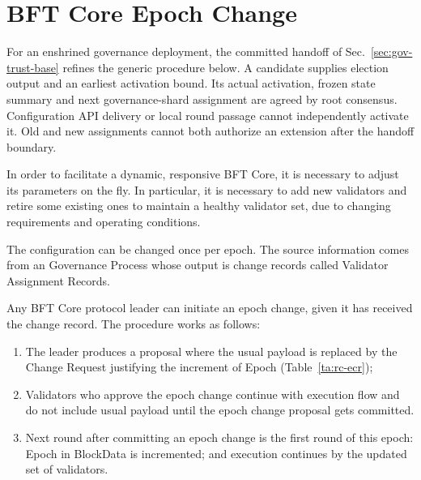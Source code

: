 \section{BFT Core Epoch Change}\label{sec:bft-epoch-change}

For an enshrined governance deployment, the committed handoff of Sec.~\ref{sec:gov-trust-base} refines the generic procedure below. A candidate supplies election output and an earliest activation bound. Its actual activation, frozen state summary and next governance-shard assignment are agreed by root consensus. Configuration API delivery or local round passage cannot independently activate it. Old and new assignments cannot both authorize an extension after the handoff boundary.


In order to facilitate a dynamic, responsive BFT Core, it is necessary to adjust its parameters on the fly. In particular, it is necessary to add new validators and retire some existing ones to maintain a healthy validator set, due to changing requirements and operating conditions.

The configuration can be changed once per epoch. The source information comes from an Governance Process whose output is change records called Validator Assignment Records.

Any BFT Core protocol leader can initiate an epoch change, given it has received the change record. The procedure works as follows:

\begin{enumerate}
  \item The leader produces a proposal where the usual payload is replaced by the Change Request justifying the increment of Epoch (Table~\ref{ta:rc-ecr});
  \item Validators who approve the epoch change continue with execution flow and do not include usual payload until the epoch change proposal gets committed.
  \item Next round after committing an epoch change is the first round of this epoch: Epoch in BlockData is incremented; and execution continues by the updated set of validators.
\end{enumerate}


